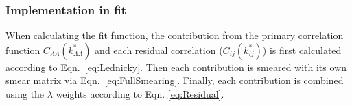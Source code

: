 \subsubsection{Implementation in fit}

When calculating the fit function, the contribution from the primary correlation function $C_{\Lambda\Lambda}(k^*_{\Lambda\Lambda})$ and each residual correlation  ($C_{ij}(k^*_{ij})$) is first calculated according to Eqn.\ \ref{eq:Lednicky}.
Then each contribution is smeared with its own smear matrix via Eqn.\ \ref{eq:FullSmearing}.
Finally, each contribution is combined using the $\lambda$ weights according to Eqn. \ref{eq:Residual}.

 